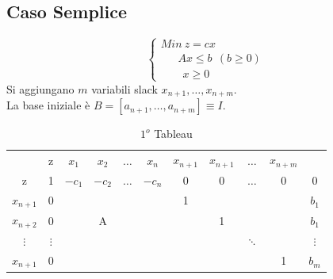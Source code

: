 \subsection{Caso Semplice}
\begin{equation*}
	\begin{cases}
		Min\ z=cx \\
		\ \ \ \ \ \ \ Ax\le b\ \ (b\ge 0) \\
		\ \ \ \ \ \ \ \ \ x\ge 0
	\end{cases}
\end{equation*}
Si aggiungano $m$ variabili slack $x_{n+1},\dots,x_{n+m}$.\\
La base iniziale è $B=[a_{n+1},\dots,a_{n+m}]\equiv I$.
\begin{table}[h]
	\centering
	\caption{$1^{o}$ Tableau}
	\begin{tabular}{c|c|cccc|cccc|c|}
		& z & $x_{1}$ & $x_{2}$ & $\dots$ & $x_{n}$ & $x_{n+1}$ & $x_{n+1}$ & $\dots$ & $x_{n+m}$ & \\ \cline{2-11}
		z & 1 & $-c_{1}$ & $-c_{2}$ & $\dots$ & $-c_{n}$ & 0 & 0 & $\dots$ & 0 & 0 \\ \cline{2-11}
		$x_{n+1}$ & 0 &  &  &  &  & 1 &  &  & & $b_{1}$ \\
		$x_{n+2}$ & 0 &  & A &  &  &  & 1 &  & & $b_{1}$ \\
		$\vdots$ & $\vdots$ &  &  &  &  &  & & $\ddots$ & & $\vdots$ \\
		$x_{n+1}$ & 0 &  &  &  &  &  &  & & 1 & $b_{m}$ \\ \cline{2-11}
	\end{tabular}
\end{table}

